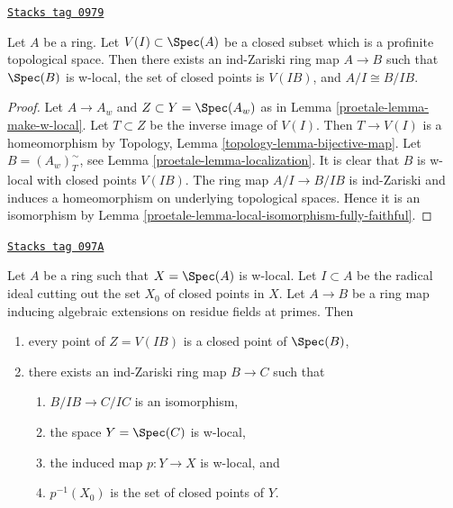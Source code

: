 \begin{lemma}
\label{proetale-lemma-localize-along-closed-profinite}
\href{https://stacks.math.columbia.edu/tag/0979}{\texttt{Stacks tag 0979}}

Let $A$ be a ring. Let $V(I) \subset \Spec(A)$ be a closed subset
which is a profinite topological space. Then there exists an
ind-Zariski ring map $A \to B$ such that $\Spec(B)$ is w-local,
the set of closed points is $V(IB)$, and $A/I \cong B/IB$.
\end{lemma}

\begin{proof}

Let $A \to A_w$ and $Z \subset Y = \Spec(A_w)$ as in
Lemma \ref{proetale-lemma-make-w-local}.
Let $T \subset Z$ be the inverse image of $V(I)$.
Then $T \to V(I)$ is a homeomorphism by
Topology, Lemma \ref{topology-lemma-bijective-map}.
Let $B = (A_w)_T^\sim$, see Lemma \ref{proetale-lemma-localization}.
It is clear that $B$ is w-local with closed points $V(IB)$.
The ring map $A/I \to B/IB$ is ind-Zariski
and induces a homeomorphism on underlying
topological spaces. Hence it is an isomorphism by
Lemma \ref{proetale-lemma-local-isomorphism-fully-faithful}.
\end{proof}

\begin{lemma}
\label{proetale-lemma-w-local-algebraic-residue-field-extensions}
\href{https://stacks.math.columbia.edu/tag/097A}{\texttt{Stacks tag 097A}}

Let $A$ be a ring such that $X = \Spec(A)$ is w-local. Let $I \subset A$
be the radical ideal cutting out the set $X_0$ of closed points in $X$.
Let $A \to B$ be a ring map inducing algebraic extensions on residue
fields at primes. Then
\begin{enumerate}
\item every point of $Z = V(IB)$ is a closed point of $\Spec(B)$,
\item there exists an ind-Zariski ring map $B \to C$ such that
\begin{enumerate}
\item $B/IB \to C/IC$ is an isomorphism,
\item the space $Y = \Spec(C)$ is w-local,
\item the induced map $p : Y \to X$ is w-local, and
\item $p^{-1}(X_0)$ is the set of closed points of $Y$.
\end{enumerate}
\end{enumerate}
\end{lemma}

